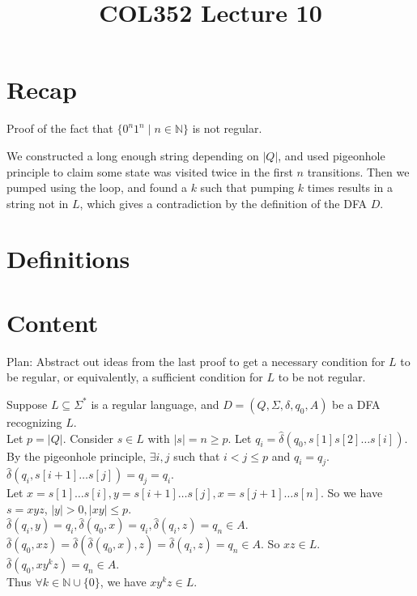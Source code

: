 \documentclass[a4paper]{article}
\title{\textbf{COL352 Lecture 10}}
\date{}
\newcommand{\nl}{\vspace{0.2cm}\\}
\newcommand{\mb}{\mathbb}
\newcommand{\hd}{\hat{\delta}}
\begin{document}
\maketitle
\tableofcontents

\section{Recap}
Proof of the fact that $\{0^n 1^n \mid n \in \mathbb{N}\}$ is not regular.

We constructed a long enough string depending on $|Q|$, and used pigeonhole principle to claim some state was visited twice in the first $n$ transitions. Then we pumped using the loop, and found a
$k$ such that pumping $k$ times results in a string not in $L$, which gives a contradiction by the definition of the DFA $D$.

\section{Definitions}


\section{Content}

\begin{note}
    Plan: Abstract out ideas from the last proof to get a necessary condition for $L$ to be regular, or equivalently, a sufficient condition for $L$ to be not regular.
\end{note}

Suppose $L \subseteq \Sigma^*$ is a regular language, and $D = (Q, \Sigma, \delta, q_0, A)$ be a DFA recognizing $L$.\nl
Let $p = |Q|$. Consider $s \in L$ with $|s| = n \ge p$. Let $q_i = \hd(q_0, s[1]s[2] \ldots s[i])$.\nl
By the pigeonhole principle, $\exists i, j$ such that $i < j \le p$ and $q_i = q_j$.\nl
$\hd(q_i, s[i+1]\ldots s[j]) = q_j = q_i$.\nl
Let $x = s[1] \ldots s[i], y = s[i+1] \ldots s[j], x = s[j+1] \ldots s[n]$. So we have $s = xyz$, $|y| > 0, |xy| \le p$.\nl
$\hd(q_i, y) = q_i, \hd(q_0, x) = q_i, \hd(q_i, z) = q_n \in A$.\nl
$\hd(q_0, xz) = \hd(\hd(q_0, x), z) = \hd(q_i, z) = q_n \in A$. So $xz \in L$.\nl
$\hd(q_0, xy^kz) = q_n \in A$.\nl
Thus $\forall k \in \mb{N} \cup \{0\}$, we have $xy^kz \in L$.\nl
\end{document}
